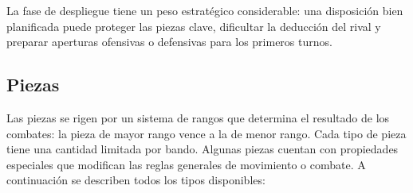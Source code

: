 La fase de despliegue tiene un peso estratégico considerable: una disposición bien planificada puede proteger las piezas clave, dificultar la deducción del rival y preparar aperturas ofensivas o defensivas para los primeros turnos.

\subsection{Piezas}

Las piezas se rigen por un sistema de rangos que determina el resultado de los combates: la pieza de mayor rango vence a la de menor rango. Cada tipo de pieza tiene una cantidad limitada por bando. Algunas piezas cuentan con propiedades especiales que modifican las reglas generales de movimiento o combate. A continuación se describen todos los tipos disponibles:

